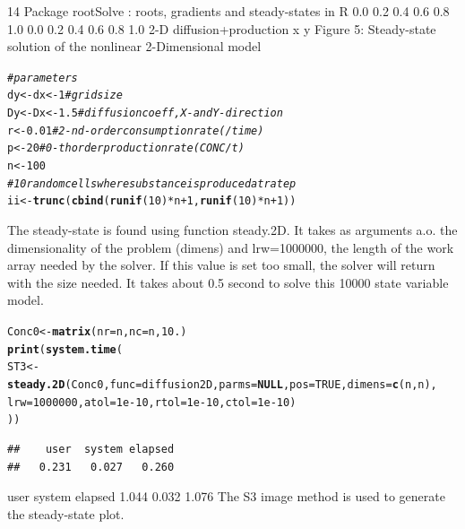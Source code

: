 \documentclass{tufte-handout}\usepackage[]{graphicx}\usepackage[]{xcolor}
\makeatletter
\newcommand{\hlnum}[1]{\textcolor[rgb]{0.686,0.059,0.569}{#1}}%
\newcommand{\hlcom}[1]{\textcolor[rgb]{0.678,0.584,0.686}{\textit{#1}}}%
\newcommand{\hlopt}[1]{\textcolor[rgb]{0,0,0}{#1}}%
\newcommand{\hlstd}[1]{\textcolor[rgb]{0.345,0.345,0.345}{#1}}%
\newcommand{\hlkwa}[1]{\textcolor[rgb]{0.161,0.373,0.58}{\textbf{#1}}}%
\newcommand{\hlkwb}[1]{\textcolor[rgb]{0.69,0.353,0.396}{#1}}%
\newcommand{\hlkwc}[1]{\textcolor[rgb]{0.333,0.667,0.333}{#1}}%
\newcommand{\hlkwd}[1]{\textcolor[rgb]{0.737,0.353,0.396}{\textbf{#1}}}%
\newenvironment{kframe}{%
 \def\at@end@of@kframe{}%
 \ifinner\ifhmode%
  \def\at@end@of@kframe{\end{minipage}}%
  \begin{minipage}{\columnwidth}%
 \fi\fi%
 \def\FrameCommand##1{\hskip\@totalleftmargin \hskip-\fboxsep
 \colorbox{shadecolor}{##1}\hskip-\fboxsep
     \hskip-\linewidth \hskip-\@totalleftmargin \hskip\columnwidth}%
 \MakeFramed {\advance\hsize-\width
   \@totalleftmargin\z@ \linewidth\hsize
   \@setminipage}}%
 {\par\unskip\endMakeFramed%
 \at@end@of@kframe}
\newenvironment{knitrout}{}{} %
\makeatother
\begin{document}
14 Package rootSolve : roots, gradients and steady-states in R
0.0 0.2 0.4 0.6 0.8 1.0
0.0 0.2 0.4 0.6 0.8 1.0
2-D diffusion+production
x
y
Figure 5: Steady-state solution of the nonlinear 2-Dimensional model
\begin{knitrout}
\color{fgcolor}\begin{kframe}
\begin{alltt}
\hlcom{# parameters}
\hlstd{dy} \hlkwb{<-} \hlstd{dx} \hlkwb{<-} \hlnum{1} \hlcom{# grid size}
\hlstd{Dy} \hlkwb{<-} \hlstd{Dx} \hlkwb{<-} \hlnum{1.5} \hlcom{# diffusion coeff, X- and Y-direction}
\hlstd{r} \hlkwb{<-} \hlnum{0.01} \hlcom{# 2-nd-order consumption rate (/time)}
\hlstd{p} \hlkwb{<-} \hlnum{20} \hlcom{# 0-th order production rate (CONC/t)}
\hlstd{n} \hlkwb{<-} \hlnum{100}
\hlcom{# 10 random cells where substance is produced at rate p}
\hlstd{ii} \hlkwb{<-} \hlkwd{trunc}\hlstd{(}\hlkwd{cbind}\hlstd{(}\hlkwd{runif}\hlstd{(}\hlnum{10}\hlstd{)}\hlopt{*}\hlstd{n}\hlopt{+}\hlnum{1}\hlstd{,}\hlkwd{runif}\hlstd{(}\hlnum{10}\hlstd{)}\hlopt{*}\hlstd{n}\hlopt{+}\hlnum{1}\hlstd{))}
\end{alltt}
\end{kframe}
\end{knitrout}
The steady-state is found using function steady.2D. It takes as arguments a.o. the dimensionality
of the problem (dimens) and lrw=1000000, the length of the work array needed by
the solver. If this value is set too small, the solver will return with the size needed.
It takes about 0.5 second to solve this 10000 state variable model.
\begin{knitrout}
\color{fgcolor}\begin{kframe}
\begin{alltt}
\hlstd{Conc0} \hlkwb{<-} \hlkwd{matrix}\hlstd{(}\hlkwc{nr}\hlstd{=n,}\hlkwc{nc}\hlstd{=n,}\hlnum{10.}\hlstd{)}
\hlkwd{print}\hlstd{(}\hlkwd{system.time}\hlstd{(}
\hlstd{ST3} \hlkwb{<-} \hlkwd{steady.2D}\hlstd{(Conc0,}\hlkwc{func}\hlstd{=diffusion2D,}\hlkwc{parms}\hlstd{=}\hlkwa{NULL}\hlstd{,}\hlkwc{pos}\hlstd{=}\hlnum{TRUE}\hlstd{,}\hlkwc{dimens}\hlstd{=}\hlkwd{c}\hlstd{(n,n),}
\hlkwc{lrw}\hlstd{=}\hlnum{1000000}\hlstd{,}\hlkwc{atol}\hlstd{=}\hlnum{1e-10}\hlstd{,}\hlkwc{rtol}\hlstd{=}\hlnum{1e-10}\hlstd{,}\hlkwc{ctol}\hlstd{=}\hlnum{1e-10}\hlstd{)}
\hlstd{))}
\end{alltt}
\begin{verbatim}
##    user  system elapsed 
##   0.231   0.027   0.260
\end{verbatim}
\end{kframe}
\end{knitrout}
user system elapsed
1.044 0.032 1.076
The S3 image method is used to generate the steady-state plot.
\end{document}
